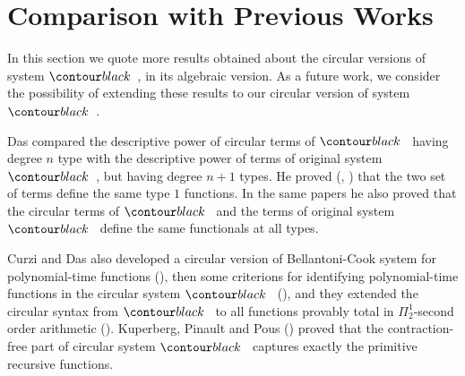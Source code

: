 \section{Comparison with Previous Works}
\label{section-comparison}

In this section we quote more results obtained about the circular versions of system $\systemT$,
in its algebraic version. As a future work, we consider the possibility of extending these results
to our circular version of system $\systemT$.

Das compared the descriptive power of circular terms of $\systemT$ 
having degree $n$ type with the descriptive power of terms of original system $\systemT$,
but having degree $n+1$ types. 
He  proved (\cite{2021-Anupam-Das}, \cite{DBLP:conf/fscd/000221})
that the two set of terms define the same type $1$ functions. In the same papers he also proved 
that the circular terms of $\systemT$ and the terms of original system $\systemT$ 
define the same functionals at all types.

Curzi and Das  also developed a circular version of Bellantoni-Cook system for 
polynomial-time functions (\cite{DBLP:conf/lics/Curzi022}), 
then some criterions for identifying polynomial-time functions
in the circular system $\systemT$ (\cite{DBLP:conf/csl/Curzi023}),
and they extended the circular syntax from $\systemT$ to all functions provably total in 
$\Pi^1_2$-second order arithmetic (\cite{DBLP:conf/lics/Curzi023}).
Kuperberg, Pinault and Pous (\cite{2021-Kuperberg-Pinault-Pous})
proved that the contraction-free part of circular system $\systemT$
captures exactly the primitive recursive functions.
